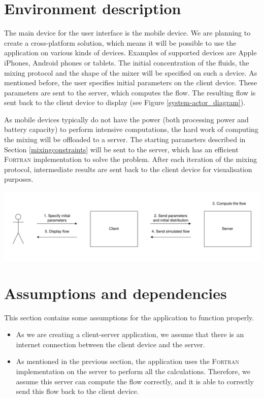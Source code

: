 \section{Environment description}
The main device for the user interface is the mobile device. We are planning to create a cross-platform solution, which means it will be possible to use the application on various kinds of devices. Examples of supported devices are Apple iPhones, Android phones or tablets. The initial concentration of the fluids, the mixing protocol and the shape of the mixer will be specified on such a device. As mentioned before, the user specifies initial parameters on the client device. These parameters are sent to the server, which computes the flow. The resulting flow is sent back to the client device to display (see Figure \ref{system-actor_diagram}).

As mobile devices typically do not have the power (both processing power and battery capacity) to perform intensive computations, the hard work of computing the mixing will be offloaded to a server. The starting parameters described in Section \ref{mixingconstraints} will be sent to the server, which has an efficient \textsc{Fortran} implementation to solve the problem. After each iteration of the mixing protocol, intermediate results are sent back to the client device for visualisation purposes.

\includegraphics[width=\textwidth]{system-actor_diagram}


\section{Assumptions and dependencies}
This section contains some assumptions for the application to function properly.

\begin{itemize}
  \item As we are creating a client-server application, we assume that there is an internet connection between the client device and the server.
  \item As mentioned in the previous section, the application uses the \textsc{Fortran} implementation on the server to perform all the calculations. Therefore, we assume this server can compute the flow correctly, and it is able to correctly send this flow back to the client device.
\end{itemize}
